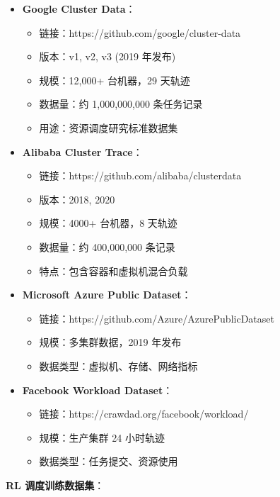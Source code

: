 \documentclass[12pt,a4paper]{article}
\begin{document}
\begin{itemize}
    \item \textbf{Google Cluster Data}：
    \begin{itemize}
        \item 链接：https://github.com/google/cluster-data
        \item 版本：v1, v2, v3 (2019 年发布)
        \item 规模：12,000+ 台机器，29 天轨迹
        \item 数据量：约 1,000,000,000 条任务记录
        \item 用途：资源调度研究标准数据集
    \end{itemize}
    
    \item \textbf{Alibaba Cluster Trace}：
    \begin{itemize}
        \item 链接：https://github.com/alibaba/clusterdata
        \item 版本：2018, 2020
        \item 规模：4000+ 台机器，8 天轨迹
        \item 数据量：约 400,000,000 条记录
        \item 特点：包含容器和虚拟机混合负载
    \end{itemize}
    
    \item \textbf{Microsoft Azure Public Dataset}：
    \begin{itemize}
        \item 链接：https://github.com/Azure/AzurePublicDataset
        \item 规模：多集群数据，2019 年发布
        \item 数据类型：虚拟机、存储、网络指标
    \end{itemize}
    
    \item \textbf{Facebook Workload Dataset}：
    \begin{itemize}
        \item 链接：https://crawdad.org/facebook/workload/
        \item 规模：生产集群 24 小时轨迹
        \item 数据类型：任务提交、资源使用
    \end{itemize}
\end{itemize}

\textbf{RL 调度训练数据集}：
\end{document}
